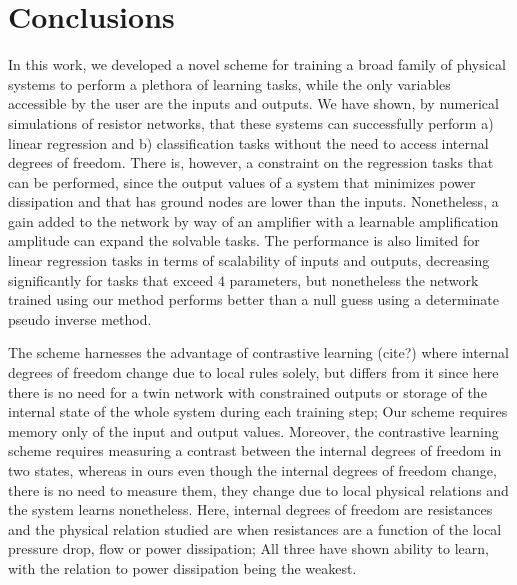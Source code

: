 \documentclass[%
 reprint,
 amsmath,amssymb,
 aps,
]{revtex4-2}
\begin{document}
\section*{Conclusions}\label{sec:conclusions}

    In this work, we developed a novel scheme for training a broad family of physical systems to perform a plethora of learning tasks, while the only variables accessible by the user are the inputs and outputs. We have shown, by numerical simulations of resistor networks, that these systems can successfully perform a) linear regression and b) classification tasks without the need to access internal degrees of freedom. There is, however, a constraint on the regression tasks that can be performed, since the output values of a system that minimizes power dissipation and that has ground nodes are lower than the inputs. Nonetheless, a gain added to the network by way of an amplifier with a learnable amplification amplitude can expand the solvable tasks. The performance is also limited for linear regression tasks in terms of scalability of inputs and outputs, decreasing significantly for tasks that exceed $4$ parameters, but nonetheless the network trained using our method performs better than a null guess using a determinate pseudo inverse method. 
    
    The scheme harnesses the advantage of contrastive learning (cite?) where internal degrees of freedom change due to local rules solely, but differs from it since here there is no need for a twin network with constrained outputs or storage of the internal state of the whole system during each training step; Our scheme requires memory only of the input and output values. Moreover, the contrastive learning scheme requires measuring a contrast between the internal degrees of freedom in two states, whereas in ours even though the internal degrees of freedom change, there is no need to measure them, they change due to local physical relations and the system learns nonetheless. Here, internal degrees of freedom are resistances and the physical relation studied are when resistances are a function of the local pressure drop, flow or power dissipation; All three have shown ability to learn, with the relation to power dissipation being the weakest.
    
\end{document}
